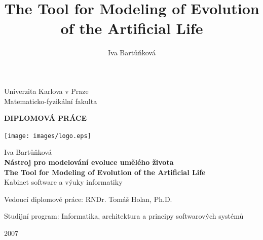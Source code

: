 \documentclass[a4paper,12pt]{report}
\title{The Tool for Modeling of Evolution of the Artificial Life}
\author{Iva Bartů\v{n}kov\'{a}}
\begin{document}
\begin{titlepage}
\begin{center}
\vspace{15mm}
\large
Univerzita Karlova v Praze\\
Matematicko-fyzikální fakulta\\

\vspace{5mm}

{\Large\bf DIPLOMOV\'{A} PR\'{A}CE}

\vspace{10mm}


\begin{center}
  \texttt{[image: images/logo.eps]}
\end{center}


\vspace{15mm}

{\Large Iva Bartů\v{n}kov\'{a}}\\
\vspace{5mm}
{\Large\bf N\'{a}stroj pro modelov\'{a}n\'{i} evoluce um\v{e}l\'{e}ho \v{z}ivota} \\
{\Large\bf The Tool for Modeling of Evolution of the Artificial Life} \\
\vspace{5mm}
Kabinet software a v\'{y}uky informatiky



\vspace{15mm}
\large
\noindent Vedoucí diplomové práce: RNDr. Tom\'{a}\v{s} Holan, Ph.D.
\vspace{1mm} 

\noindent Studijní program: Informatika, architektura a principy softwarov\'{y}ch syst\'{e}mů %

\vspace{20mm}

2007
\end{center}

\end{titlepage}
\normalsize %
\setcounter{page}{2} %
\ \vspace{10mm} 

\noindent 
\end{document}

